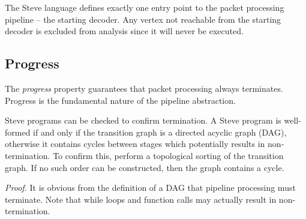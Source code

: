 %
%

The Steve language defines exactly one entry point to the packet processing pipeline -- the starting decoder. Any vertex not reachable from the starting decoder is excluded from analysis since it will never be executed.

\subsection{Progress} \label{guide:progress}

The \textit{progress} property guarantees that packet processing always terminates.
Progress is the fundamental nature of the pipeline abstraction.

Steve programs can be checked to confirm termination.
A Steve program is well-formed if and only if the transition graph is a directed acyclic graph (DAG), otherwise it contains cycles between stages which potentially results in non-termination.
To confirm this, perform a topological sorting of the transition graph. If no such order can be constructed, then the graph contains a cycle.

\emph{Proof.} It is obvious from the definition of a DAG that pipeline processing must terminate. Note that while loops and function calls may actually result in non-termination.

